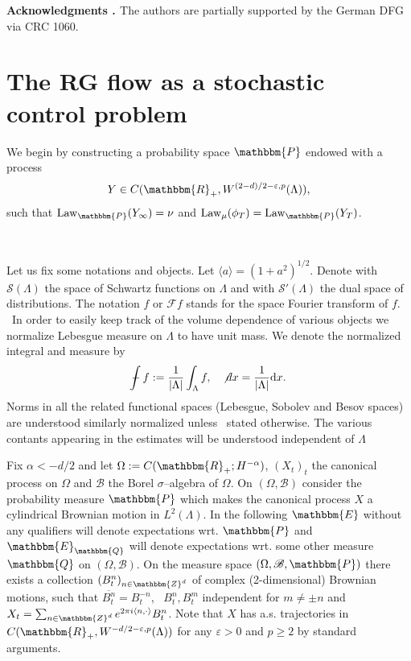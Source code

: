\documentclass[11pt, oneside]{article}   	%
\newcommand{\assign}{:=}
\newcommand{\mathd}{\mathrm{d}}
\newcommand{\tmop}[1]{\ensuremath{\operatorname{#1}}}
\newcommand{\tmtextbf}[1]{{\bfseries{#1}}}
\def\Xint#1{\mathchoice
{\XXint\displaystyle\textstyle{#1}}%
{\XXint\textstyle\scriptstyle{#1}}%
{\XXint\scriptstyle\scriptscriptstyle{#1}}%
{\XXint\scriptscriptstyle\scriptscriptstyle{#1}}%
\!\int}
\def\XXint#1#2#3{{\setbox0=\hbox{$#1{#2#3}{\int}$ }
\vcenter{\hbox{$#2#3$ }}\kern-.6\wd0}}
\def\dashint{\Xint-}
\newcommand{\bint}{\dashint}
\newcommand{\dint}{\not{d}}
\newcommand{\CF}{\mathscr{F}}
\newcommand{\CB}{\mathscr{B}}
\newcommand{\CS}{\mathscr{S}}
\begin{document}
\medskip
{\noindent}\tmtextbf{Acknowledgments . }The authors are partially supported
by the German DFG via CRC 1060.{\hspace*{\fill}}{\medskip}

\section{The RG flow as a stochastic control problem}\label{sec:rg-flow}

We begin by constructing a probability space $\mathbbm{P}$ endowed with a
process $$Y \in C (\mathbbm{R}_+, W^{(2 - d) / 2 - \varepsilon, p}
(\Lambda)),$$ such that $\tmop{Law}_{\mathbbm{P}} (Y_{\infty}) = \nu$ and
$\tmop{Law}_{\mu} (\phi_T) = \tmop{Law}_{\mathbbm{P}} (Y_T)$.

\

Let us fix some notations and objects. Let $\langle a \rangle = (1 + a^2)^{1
/ 2}$. Denote with $\CS (\Lambda)$ the space of Schwartz functions on
$\Lambda$ and with $\CS' (\Lambda)$ the dual space of distributions. The
notation $\hat{f}$ or $\CF f$ stands for the space Fourier transform of $f$. \
In order to easily keep track of the volume dependence of various objects we
normalize Lebesgue measure on $\Lambda$ to have unit mass. We denote the
normalized integral and measure by
\[ \bint f \assign \frac{1}{| \Lambda |} \int_{\Lambda} f, \quad \dint x =
   \frac{1}{| \Lambda |} \mathd x. \]
Norms in all the related functional spaces (Lebesgue, Sobolev and Besov
spaces) are understood similarly normalized unless \ stated otherwise. The
various contants appearing in the estimates will be understood independent of
$\Lambda$



Fix $\alpha < - d / 2$ and let $\Omega \assign C (\mathbbm{R}_+ ; H^{-
\alpha})$, $(X_t)_t$ the canonical process on $\Omega$ and $\CB$ the Borel
$\sigma$--algebra of $\Omega$. On $\left( \Omega, \CB \right)$ consider the
probability measure $\mathbbm{P}$ which makes the canonical process $X$ a
cylindrical Brownian motion in $L^2 (\Lambda)$. In the following $\mathbbm{E}$
without any qualifiers will denote expectations wrt. $\mathbbm{P}$ and
$\mathbbm{E}_{\mathbbm{Q}}$ will denote expectations wrt. some other measure
$\mathbbm{Q}$ on $\left( \Omega, \CB \right)$. On the measure space $\left(
\Omega, \CB, \mathbbm{P} \right)$ there exists a collection $(B_t^n)_{n \in
\mathbbm{Z}^d}$ of complex (2-dimensional) Brownian motions, such that
$\overline{B^n_t} = B^{- n}_t$, \ $B^n_t, B^m_t$ independent for $m \neq \pm
n$ and $X_t = \sum_{n \in \mathbbm{Z}^d} e^{2 \pi i \langle n, \cdot \rangle}
B^n_t$. Note that $X$ has a.s. trajectories in $C (\mathbbm{R}_+, W^{- d / 2 -
\varepsilon, p} (\Lambda))$ for any $\varepsilon > 0$ and $p \geqslant 2$ by
standard arguments.
\end{document}
